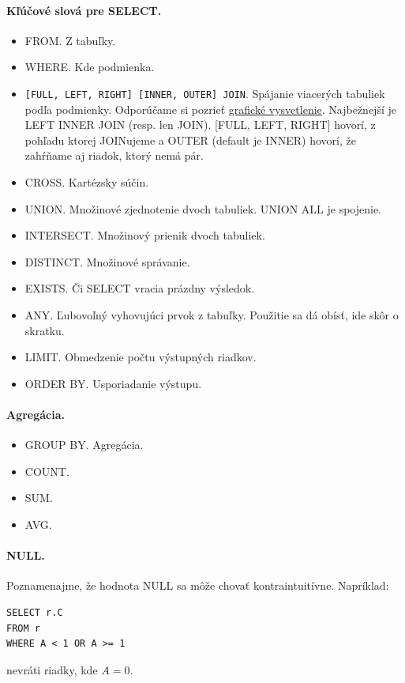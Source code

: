 \documentclass[10pt,a4paper]{article}
\begin{document}
\paragraph{Kľúčové slová pre SELECT.}
\begin{itemize}
\item FROM. Z tabuľky.  
\item WHERE. Kde podmienka. 
\item \verb|[FULL, LEFT, RIGHT] [INNER, OUTER] JOIN|. Spájanie viacerých tabuliek podľa podmienky. Odporúčame si pozrieť \href{http://www.codinghorror.com/blog/2007/10/a-visual-explanation-of-sql-joins.html}{grafické vysvetlenie}. Najbežnejší je LEFT INNER JOIN (resp. len JOIN). [FULL, LEFT, RIGHT] hovorí, z pohľadu ktorej JOINujeme a OUTER (default je INNER) hovorí, že zahŕňame aj riadok, ktorý nemá pár. 
\item CROSS. Kartézsky súčin. 
\item UNION. Množinové zjednotenie dvoch tabuliek. UNION ALL je spojenie.
\item INTERSECT. Množinový prienik dvoch tabuliek. 
\item DISTINCT. Množinové správanie.    
\item EXISTS. Či SELECT vracia prázdny výsledok. 
\item ANY. Ľubovoľný vyhovujúci prvok z tabuľky. Použitie sa dá obísť, ide skôr o skratku. 
\item LIMIT. Obmedzenie počtu výstupných riadkov.
\item ORDER BY. Usporiadanie výstupu.
\end{itemize}

\paragraph{Agregácia.}
\begin{itemize}
\item GROUP BY. Agregácia.  
\item COUNT.
\item SUM.
\item AVG. 
\end{itemize}

\paragraph{NULL.}
Poznamenajme, že hodnota NULL sa môže chovať kontraintuitívne. 
Napríklad: 
\begin{verbatim}
SELECT r.C
FROM r
WHERE A < 1 OR A >= 1
\end{verbatim} 
nevráti riadky, kde $A=0$. 
\end{document}
